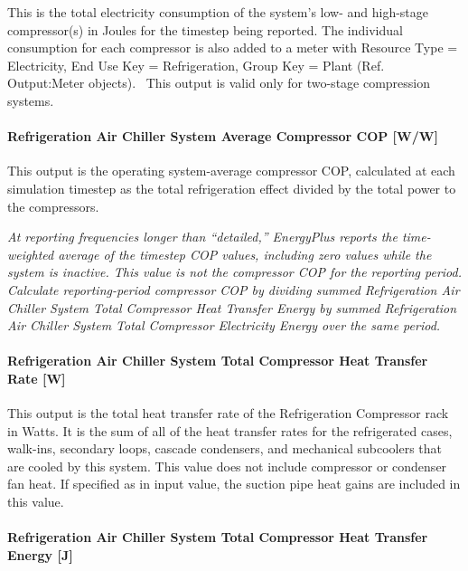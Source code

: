 This is the total electricity consumption of the system's low- and high-stage compressor(s) in Joules for the timestep being reported. The individual consumption for each compressor is also added to a meter with Resource Type = Electricity, End Use Key = Refrigeration, Group Key = Plant (Ref. Output:Meter objects).~ This output is valid only for two-stage compression systems.

\paragraph{Refrigeration Air Chiller System Average Compressor COP {[}W/W{]}}\label{refrigeration-air-chiller-system-average-compressor-cop-ww}

This output is the operating system-average compressor COP, calculated at each simulation timestep as the total refrigeration effect divided by the total power to the compressors.

\emph{At reporting frequencies longer than ``detailed,'' EnergyPlus reports the time-weighted average of the timestep COP values, including zero values while the system is inactive. This value is not the compressor COP for the reporting period. Calculate reporting-period compressor COP by dividing summed Refrigeration Air Chiller System Total Compressor Heat Transfer Energy by summed Refrigeration Air Chiller System Total Compressor Electricity Energy over the same period.}

\paragraph{Refrigeration Air Chiller System Total Compressor Heat Transfer Rate {[}W{]}}\label{refrigeration-air-chiller-system-total-compressor-heat-transfer-rate-w}

This output is the total heat transfer rate of the Refrigeration Compressor rack in Watts. It is the sum of all of the heat transfer rates for the refrigerated cases, walk-ins, secondary loops, cascade condensers, and mechanical subcoolers that are cooled by this system. This value does not include compressor or condenser fan heat. If specified as in input value, the suction pipe heat gains are included in this value.

\paragraph{Refrigeration Air Chiller System Total Compressor Heat Transfer Energy {[}J{]}}\label{refrigeration-air-chiller-system-total-compressor-heat-transfer-energy-j}


